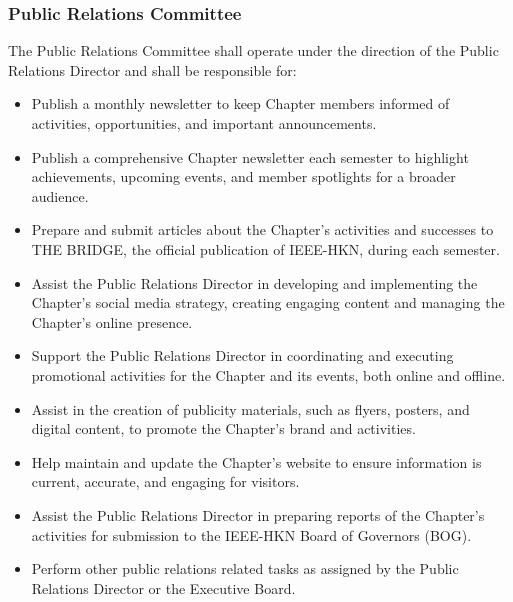 \documentclass[10pt, oneside]{article}
\begin{document}
\subsubsection{Public Relations Committee}
The Public Relations Committee shall operate under the direction of the Public Relations Director and shall be responsible for:
\begin{itemize}
    \item Publish a monthly newsletter to keep Chapter members informed of activities, opportunities, and important announcements.
    \item Publish a comprehensive Chapter newsletter each semester to highlight achievements, upcoming events, and member spotlights for a broader audience.
    \item Prepare and submit articles about the Chapter's activities and successes to THE BRIDGE, the official publication of IEEE-HKN, during each semester.
    \item Assist the Public Relations Director in developing and implementing the Chapter's social media strategy, creating engaging content and managing the Chapter's online presence.
    \item Support the Public Relations Director in coordinating and executing promotional activities for the Chapter and its events, both online and offline.
    \item Assist in the creation of publicity materials, such as flyers, posters, and digital content, to promote the Chapter's brand and activities.
    \item Help maintain and update the Chapter's website to ensure information is current, accurate, and engaging for visitors.
    \item Assist the Public Relations Director in preparing reports of the Chapter's activities for submission to the IEEE-HKN Board of Governors (BOG).
    \item Perform other public relations related tasks as assigned by the Public Relations Director or the Executive Board.
\end{itemize}
\end{document}

